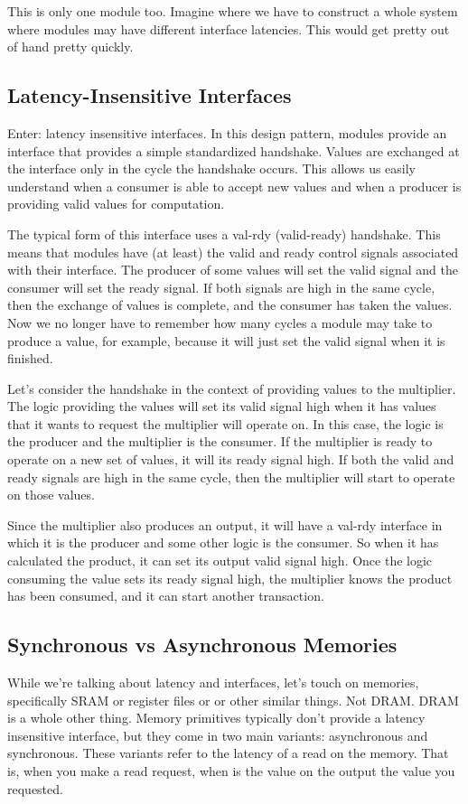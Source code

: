 \documentclass{article}
\begin{document}
This is only one module too. Imagine where we have to construct a whole
system where modules may have different interface latencies. This would get
pretty out of hand pretty quickly.

\subsection*{Latency-Insensitive Interfaces}
Enter: latency insensitive interfaces. In this design pattern, modules provide
an interface that provides a simple standardized handshake. Values are exchanged
at the interface only in the cycle the handshake occurs. This allows us easily
understand when a consumer is able to accept new values and when a producer is
providing valid values for computation. 

The typical form of this interface uses a val-rdy (valid-ready) handshake. This
means that modules have (at least) the valid and ready control signals
associated with their interface. The producer of some values will set the valid
signal and the consumer will set the ready signal. If both signals are high in
the same cycle, then the exchange of values is complete, and the consumer has
taken the values. Now we no longer have to remember how many cycles a module may
take to produce a value, for example, because it will just set the valid signal
when it is finished.

Let's consider the handshake in the context of providing values to the
multiplier. The logic providing the values will set its valid signal high when
it has values that it wants to request the multiplier will operate on. In this
case, the logic is the producer and the multiplier is the consumer. If the
multiplier is ready to operate on a new set of values, it will its ready signal
high. If both the valid and ready signals are high in the same cycle, then the
multiplier will start to operate on those values.

Since the multiplier also produces an output, it will have a val-rdy interface
in which it is the producer and some other logic is the consumer. So when it has
calculated the product, it can set its output valid signal high. Once the logic
consuming the value sets its ready signal high, the multiplier knows the product
has been consumed, and it can start another transaction.

\subsection*{Synchronous vs Asynchronous Memories}
While we're talking about latency and interfaces, let's touch on memories,
specifically SRAM or register files or or other similar things. Not DRAM. DRAM
is a whole other thing.  Memory primitives typically don't provide a latency
insensitive interface, but they come in two main variants: asynchronous and
synchronous. These variants refer to the latency of a read on the memory. That
is, when you make a read request, when is the value on the output the value you
requested.
\end{document}
